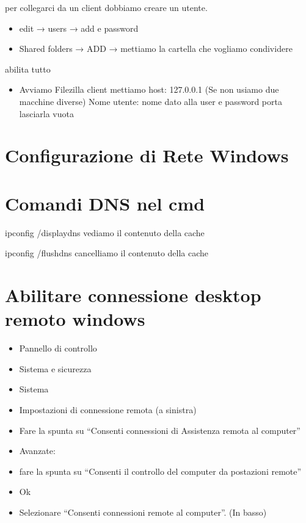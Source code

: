per collegarci da un client dobbiamo creare un utente.

\begin{itemize}
\item
  edit → users → add e password
\item
  Shared folders → ADD → mettiamo la cartella che vogliamo condividere
\end{itemize}

abilita tutto

\begin{itemize}
\item
  Avviamo Filezilla client mettiamo host: 127.0.0.1 (Se non usiamo due
  macchine diverse) Nome utente: nome dato alla user e password porta
  lasciarla vuota
\end{itemize}

\section{Configurazione di Rete
Windows}\label{configurazione-di-rete-windows}

\section{Comandi DNS nel cmd}\label{comandi-dns-nel-cmd}

ipconfig /displaydns vediamo il contenuto della cache

ipconfig /flushdns cancelliamo il contenuto della cache

\section{Abilitare connessione desktop remoto
windows}\label{abilitare-connessione-desktop-remoto-windows}

\begin{itemize}
\item
  Pannello di controllo
\item
  Sistema e sicurezza
\item
  Sistema
\item
  Impostazioni di connessione remota (a sinistra)
\item
  Fare la spunta su ``Consenti connessioni di Assistenza remota al
  computer''
\item
  Avanzate:
\item
  fare la spunta su ``Consenti il controllo del computer da postazioni
  remote''
\item
  Ok
\item
  Selezionare ``Consenti connessioni remote al computer''. (In basso)
\end{itemize}

